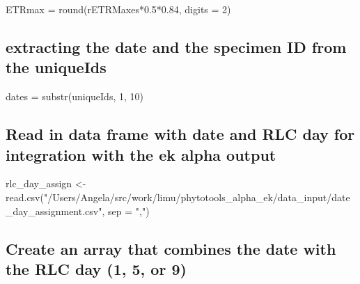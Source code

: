 \documentclass[
]{article}
\newenvironment{Shaded}{\begin{snugshade}}{\end{snugshade}}
\newcommand{\AttributeTok}[1]{\textcolor[rgb]{0.77,0.63,0.00}{#1}}
\newcommand{\DecValTok}[1]{\textcolor[rgb]{0.00,0.00,0.81}{#1}}
\newcommand{\FloatTok}[1]{\textcolor[rgb]{0.00,0.00,0.81}{#1}}
\newcommand{\FunctionTok}[1]{\textcolor[rgb]{0.00,0.00,0.00}{#1}}
\newcommand{\NormalTok}[1]{#1}
\newcommand{\OtherTok}[1]{\textcolor[rgb]{0.56,0.35,0.01}{#1}}
\newcommand{\SpecialCharTok}[1]{\textcolor[rgb]{0.00,0.00,0.00}{#1}}
\newcommand{\StringTok}[1]{\textcolor[rgb]{0.31,0.60,0.02}{#1}}
\begin{document}
\begin{Shaded}
\begin{Highlighting}[]
\NormalTok{ETRmax }\OtherTok{=} \FunctionTok{round}\NormalTok{(rETRMaxes}\SpecialCharTok{*}\FloatTok{0.5}\SpecialCharTok{*}\FloatTok{0.84}\NormalTok{, }\AttributeTok{digits =} \DecValTok{2}\NormalTok{)}
\end{Highlighting}
\end{Shaded}

\hypertarget{extracting-the-date-and-the-specimen-id-from-the-uniqueids}{%
\subsection{extracting the date and the specimen ID from the
uniqueIds}\label{extracting-the-date-and-the-specimen-id-from-the-uniqueids}}

\begin{Shaded}
\begin{Highlighting}[]
\NormalTok{dates }\OtherTok{=} \FunctionTok{substr}\NormalTok{(uniqueIds, }\DecValTok{1}\NormalTok{, }\DecValTok{10}\NormalTok{)}
\end{Highlighting}
\end{Shaded}

\hypertarget{read-in-data-frame-with-date-and-rlc-day-for-integration-with-the-ek-alpha-output}{%
\subsection{Read in data frame with date and RLC day for integration
with the ek alpha
output}\label{read-in-data-frame-with-date-and-rlc-day-for-integration-with-the-ek-alpha-output}}

\begin{Shaded}
\begin{Highlighting}[]
\NormalTok{rlc\_day\_assign }\OtherTok{\textless{}{-}} \FunctionTok{read.csv}\NormalTok{(}\StringTok{"/Users/Angela/src/work/limu/phytotools\_alpha\_ek/data\_input/date\_day\_assignment.csv"}\NormalTok{, }\AttributeTok{sep =} \StringTok{","}\NormalTok{)}
\end{Highlighting}
\end{Shaded}

\hypertarget{create-an-array-that-combines-the-date-with-the-rlc-day-1-5-or-9}{%
\subsection{Create an array that combines the date with the RLC day (1,
5, or
9)}\label{create-an-array-that-combines-the-date-with-the-rlc-day-1-5-or-9}}
\end{document}
